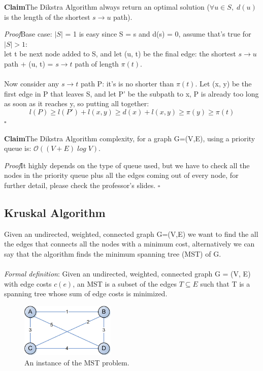 \documentclass[11pt]{article}
\newenvironment{claim}[1]{\par\textbf{Claim}\space#1}{}
\newenvironment{proof}[1]{\par\textit{Proof}\space#1}{\hfill\ensuremath{\square}}
\begin{document}
\begin{claim}
The Dikstra Algorithm always return an optimal solution ($\forall u \in S, \; d(u)$ is the length of the shortest $s\rightarrow u$ path).
\end{claim}
\begin{proof}
Base case: $| S |$ = 1 is easy since S = { s } and d(s) = 0, assume that's true for $| S | > 1$:\\
let t be next node added to S, and let (u, t) be the final edge: the shortest $s\rightarrow u$ path + (u, t) = $s\rightarrow t$ path of length $π(t)$.\\\\Now consider any $s\rightarrow t$ path P: it's is no shorter than $π(t)$. Let (x, y) be the first edge in P that leaves S, and let P' be the subpath to x, P is already too long as soon as it reaches y, so putting all together:
\[l( P ) \geq l( P ' ) + l( x , y ) \geq d ( x ) + l( x , y ) \geq π ( y ) \geq π (t)\]
\end{proof}\\

\begin{claim}
The Dikstra Algorithm complexity, for a graph G=(V,E), using a priority queue is: $\mathcal{O}{((V + E) \; log\; V)}$.
\end{claim}

\begin{proof}
It highly depends on the type of queue used, but we have to check all the nodes in the priority queue plus all the edges coming out of every node, for further detail, please check the professor's slides.
\end{proof}\\


\subsection{Kruskal Algorithm}
Given an undirected, weighted, connected graph G=(V,E) we want to find the all the edges that connects all the nodes with a minimum cost, alternatively we can say that the algorithm finds the minimum spanning tree (MST) of G.\\\\
\emph{Formal definition}: Given an undirected, weighted, connected  graph G = (V, E) with edge costs $c(e)$, an MST is a subset of the edges $T \subseteq E$ such that T is a spanning tree whose sum of edge costs is minimized.

\begin{figure}[H]
		\centering
		\includegraphics[width=0.4\textwidth ]{kruskal}
		\caption{An instance of the MST problem.}
\end{figure}
\end{document}
